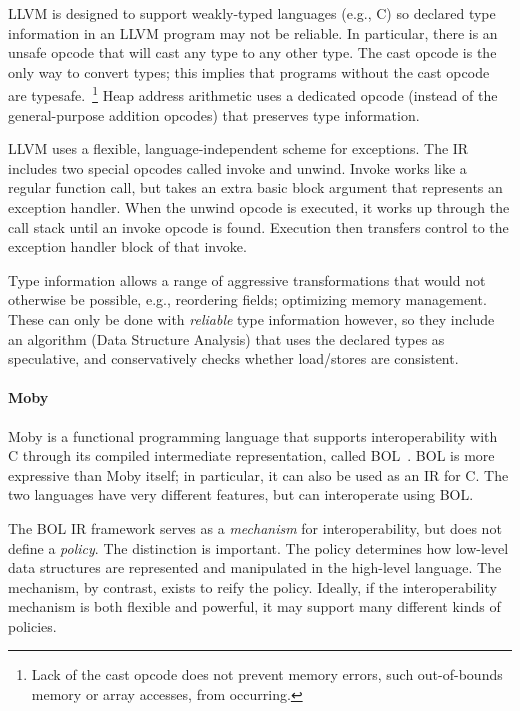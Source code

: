 LLVM is designed to support weakly-typed languages (e.g., C) so declared type information in an LLVM program may not be reliable. In particular, there is an unsafe opcode that will cast any type to any other type. The cast opcode is the only way to convert types; this implies that programs without the cast opcode are typesafe.~\footnote{Lack of the cast opcode does not prevent memory errors, such out-of-bounds memory or array accesses, from occurring.} Heap address arithmetic uses a dedicated opcode (instead of the general-purpose addition opcodes) that preserves type information.

LLVM uses a flexible, language-independent scheme for exceptions. The IR includes two special opcodes called invoke and unwind. Invoke works like a regular function call, but takes an extra basic block argument that represents an exception handler. When the unwind opcode is executed, it works up through the call stack until an invoke opcode is found. Execution then transfers control to the exception handler block of that invoke.

Type information allows a range of aggressive transformations that would not otherwise be possible, e.g., reordering fields; optimizing memory management. These can only be done with \emph{reliable} type information however, so they include an algorithm (Data Structure Analysis) that uses the declared types as speculative, and conservatively checks whether load/stores are consistent.


\paragraph{Moby}
\label{bol}

Moby is a functional programming language that supports interoperability with C through its compiled intermediate representation, called BOL~\cite{fisher01interop, reppy06ffi}. BOL is more expressive than Moby itself; in particular, it can also be used as an IR for C. The two languages have very different features, but can interoperate using BOL.

The BOL IR framework serves as a \emph{mechanism} for interoperability, but does not define a \emph{policy}. The distinction is important. The policy determines how low-level data structures are represented and manipulated in the high-level language. The mechanism, by contrast, exists to reify the policy. Ideally, if the interoperability mechanism is both flexible and powerful, it may support many different kinds of policies.

